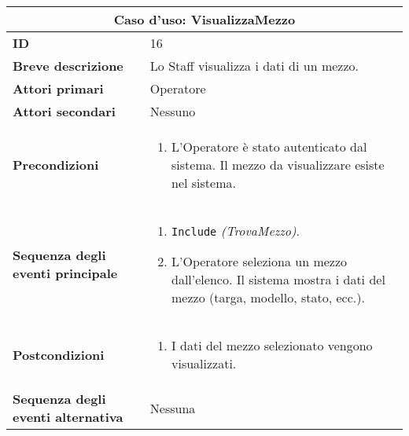 \documentclass[a4paper]{report}
\begin{document}
\clearpage
\begin{table}[H]
\vspace*{-0cm}
\renewcommand{\arraystretch}{1.9}
\begin{tabular}{|p{3.9cm}|p{9.9cm}|}
\hline
\multicolumn{2}{|c|}{\textbf{Caso d’uso: VisualizzaMezzo}} \\ \hline
	\textbf{ID} & 16 \\ \hline
	\textbf{Breve descrizione} & Lo Staff visualizza i dati di un mezzo. \\ \hline
	\textbf{Attori primari} & Operatore \\ \hline
	\textbf{Attori secondari} & Nessuno \\ \hline
	\textbf{Precondizioni} & \begin{enumerate}[label=\arabic*.,leftmargin=14pt,labelsep=0.5em,topsep=0pt,partopsep=0pt,parsep=0pt,itemsep=0pt]
        \item L’Operatore è stato autenticato dal sistema. Il mezzo da visualizzare esiste nel sistema.
    \end{enumerate} \\ \hline
	\textbf{Sequenza degli eventi principale} & \begin{enumerate}[label=\arabic*.,leftmargin=14pt,labelsep=0.5em,topsep=0pt,partopsep=0pt,parsep=0pt,itemsep=0pt]
        \item \texttt{Include} \textit{(TrovaMezzo)}. 
        \item L’Operatore seleziona un mezzo dall’elenco. Il sistema mostra i dati del mezzo (targa, modello, stato, ecc.).
    \end{enumerate}\\ \hline
	\textbf{Postcondizioni} & \begin{enumerate}[label=\arabic*.,leftmargin=14pt,labelsep=0.5em,topsep=0pt,partopsep=0pt,parsep=0pt,itemsep=0pt]
        \item I dati del mezzo selezionato vengono visualizzati.
    \end{enumerate}\\ \hline
	\textbf{Sequenza degli eventi alternativa} & Nessuna \\ \hline
\end{tabular}
\end{table}
\end{document}
